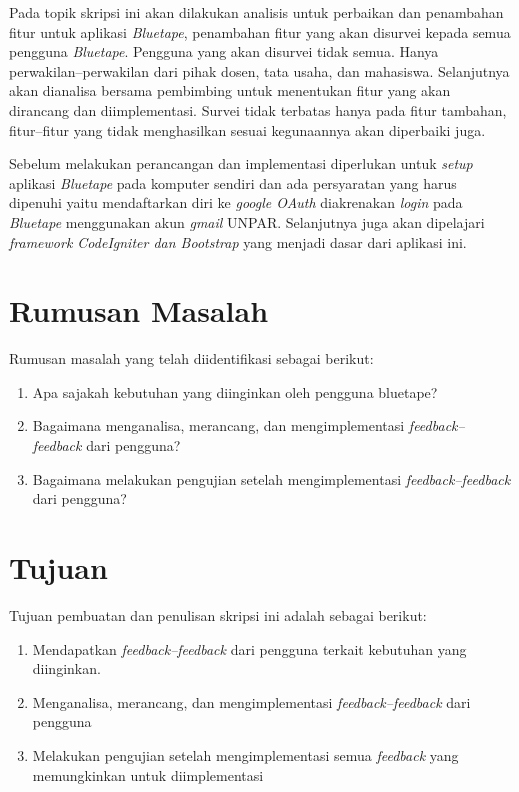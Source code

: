 Pada topik skripsi ini akan dilakukan analisis untuk perbaikan dan penambahan fitur untuk aplikasi \textit{Bluetape}, penambahan fitur yang akan disurvei kepada semua pengguna \textit{Bluetape}. Pengguna yang akan disurvei tidak semua. Hanya perwakilan--perwakilan dari pihak dosen, tata usaha, dan mahasiswa. Selanjutnya akan dianalisa bersama pembimbing untuk menentukan fitur yang akan dirancang dan diimplementasi. Survei tidak terbatas hanya pada fitur tambahan, fitur--fitur yang tidak menghasilkan sesuai kegunaannya akan diperbaiki juga.


Sebelum melakukan perancangan dan implementasi diperlukan untuk \textit{setup} aplikasi \textit{Bluetape} pada komputer sendiri dan ada persyaratan yang harus dipenuhi yaitu mendaftarkan diri ke \textit{google OAuth} diakrenakan \textit{login} pada \textit{Bluetape} menggunakan akun \textit{gmail} UNPAR. Selanjutnya juga akan dipelajari \textit{framework CodeIgniter dan Bootstrap} yang menjadi dasar dari aplikasi ini. 

\section{Rumusan Masalah}
\label{sec:rumusan}
Rumusan masalah yang telah diidentifikasi sebagai berikut:
\begin{enumerate}
	\item Apa sajakah kebutuhan yang diinginkan oleh pengguna bluetape?
	\item Bagaimana menganalisa, merancang, dan mengimplementasi \textit{feedback--feedback} dari pengguna?
	\item Bagaimana melakukan pengujian setelah mengimplementasi \textit{feedback--feedback} dari pengguna?

\end{enumerate}

\section{Tujuan}
\label{sec:tujuan}
Tujuan pembuatan dan penulisan skripsi ini adalah sebagai berikut:
\begin{enumerate}
	\item Mendapatkan \textit{feedback--feedback} dari pengguna terkait kebutuhan yang diinginkan.
	\item Menganalisa, merancang, dan mengimplementasi \textit{feedback--feedback} dari pengguna
	\item Melakukan pengujian setelah mengimplementasi semua \textit{feedback} yang memungkinkan untuk diimplementasi

\end{enumerate}


